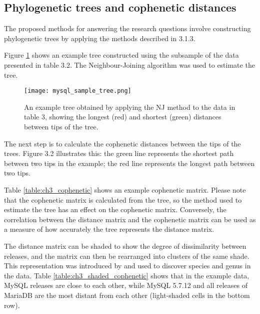 

\subsection{Phylogenetic trees and cophenetic distances}
The proposed methods for answering the research questions involve constructing phylogenetic trees by applying the methods described in 3.1.3.

Figure \ref{fig:sample_tree} shows an example tree constructed using the subsample of the data presented in table 3.2. The Neighbour-Joining algorithm \citep{Saitou1987a} was used to estimate the tree.

\begin{figure}[H]
  \centering
  \texttt{[image: mysql\_sample\_tree.png]}
  \caption{An example tree obtained by applying the NJ method to the data in table 3, showing the longest (red) and shortest (green) distances between tips of the tree.}
  \label{fig:sample_tree}
\end{figure}

The next step is to calculate the cophenetic distances between the tips of the trees. Figure 3.2 illustrates this: the green line represents the shortest path between two tips in the example; the red line represents the longest path between two tips.

Table \ref{table:ch3_cophenetic} shows an example cophenetic matrix. Please note that the cophenetic matrix is calculated from the tree, so the method used to estimate the tree has an effect on the cophenetic matrix. Conversely, the correlation between the distance matrix and the cophenetic matrix can be used as a measure of how accurately the tree represents the distance matrix.



The distance matrix can be shaded to show the degree of dissimilarity between releases, and the matrix can then be rearranged into clusters of the same shade. This representation was introduced by \citet{Sneath1962a} and used to discover species and genus in the data. Table \ref{table:ch3_shaded_cophenetic} shows that in the example data, MySQL releases are close to each other, while MySQL 5.7.12 and all releases of MariaDB are the most distant from each other (light-shaded cells in the bottom row).



